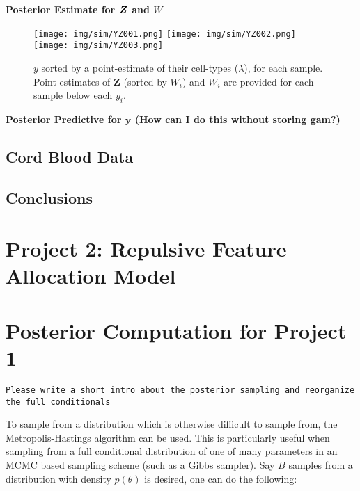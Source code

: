 \documentclass[12pt,]{article}
\def\beginmyfig{\begin{figure}[H]\center}
\def\endmyfig{\end{figure}}
\def\y{\bm{y}}
\def\Z{\bm{Z}}
\newcommand{\bZ}{\mbox{\boldmath $Z$}}
\def\beginmyfig{\begin{figure}[H]\center}
\def\endmyfig{\end{figure}}
\begin{document}
\textbf{Posterior Estimate for $\bZ$ and $W$}
\beginmyfig
\texttt{[image: img/sim/YZ001.png]}
\texttt{[image: img/sim/YZ002.png]}
\texttt{[image: img/sim/YZ003.png]}
\caption{$y$ sorted by a point-estimate of their cell-types ($\lambda$), for
each sample.  Point-estimates of $\Z$ (sorted by $W_i$) and $W_i$ are provided
for each sample below each $y_i$.}
\label{fig:sim-post-Z}
\endmyfig

\textbf{Posterior Predictive for $\y$ (How can I do this without storing gam?)}



\subsection{Cord Blood Data}

\subsection{Conclusions}

\section{Project 2: Repulsive Feature Allocation Model}







\appendix
\section{Posterior Computation for Project 1}
{\tt Please write a short intro about the posterior sampling and reorganize the full conditionals }


To sample from a distribution which is otherwise difficult to sample
from, the Metropolis-Hastings algorithm can be used. This is
particularly useful when sampling from a full conditional distribution
of one of many parameters in an MCMC based sampling scheme (such as a
Gibbs sampler). Say \(B\) samples from a distribution with density
\(p(\theta)\) is desired, one can do the following:
\end{document}
